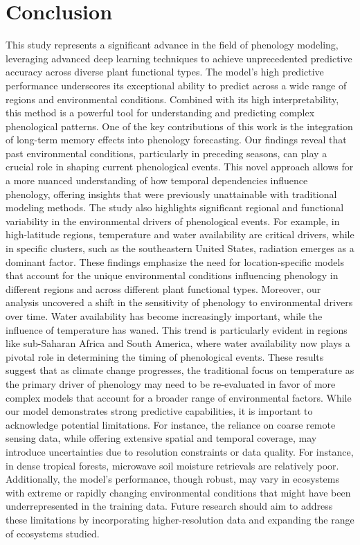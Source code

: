\documentclass[pdflatex,sn-mathphys-num]{sn-jnl}%
\theoremstyle{thmstyleone}%
\theoremstyle{thmstyletwo}%
\theoremstyle{thmstylethree}%
\begin{document}
\section{Conclusion}\label{sec4}

This study represents a significant advance in the field of phenology modeling, leveraging advanced deep learning techniques to achieve unprecedented predictive accuracy across diverse plant functional types. The model’s high predictive performance underscores its exceptional ability to predict across a wide range of regions and environmental conditions. Combined with its high interpretability, this method is a powerful tool for understanding and predicting complex phenological patterns.
One of the key contributions of this work is the integration of long-term memory effects into phenology forecasting. Our findings reveal that past environmental conditions, particularly in preceding seasons, can play a crucial role in shaping current phenological events. This novel approach allows for a more nuanced understanding of how temporal dependencies influence phenology, offering insights that were previously unattainable with traditional modeling methods.
The study also highlights significant regional and functional variability in the environmental drivers of phenological events. For example, in high-latitude regions, temperature and water availability are critical drivers, while in specific clusters, such as the southeastern United States, radiation emerges as a dominant factor. These findings emphasize the need for location-specific models that account for the unique environmental conditions influencing phenology in different regions and across different plant functional types.
Moreover, our analysis uncovered a shift in the sensitivity of phenology to environmental drivers over time. Water availability has become increasingly important, while the influence of temperature has waned. This trend is particularly evident in regions like sub-Saharan Africa and South America, where water availability now plays a pivotal role in determining the timing of phenological events. These results suggest that as climate change progresses, the traditional focus on temperature as the primary driver of phenology may need to be re-evaluated in favor of more complex models that account for a broader range of environmental factors.
While our model demonstrates strong predictive capabilities, it is important to acknowledge potential limitations. For instance, the reliance on coarse remote sensing data, while offering extensive spatial and temporal coverage, may introduce uncertainties due to resolution constraints or data quality. For instance, in dense tropical forests, microwave soil moisture retrievals are relatively poor. Additionally, the model’s performance, though robust, may vary in ecosystems with extreme or rapidly changing environmental conditions that might have been underrepresented in the training data. Future research should aim to address these limitations by incorporating higher-resolution data and expanding the range of ecosystems studied.
\end{document}
